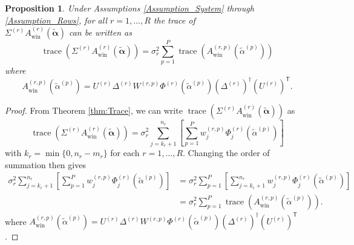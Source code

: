\documentclass[12pt]{article}
\newcommand{\trans}[1]{{#1}^\mathsf{T}}	%
\newcommand{\pinv}[1]{{#1}^\dagger}	%
\DeclareMathOperator{\trace}{trace}		%
\newcommand{\regparam}{\alpha}  %
\newcommand{\regparamVec}{\bm{\regparam}}   %
\newcommand{\regparamBig}{\widetilde{\regparam}}   %
\newcommand{\regparamVecBig}{\widetilde{\regparamVec}}   %
\newcommand{\AWin}{A_{\text{win}}}	%
\newcommand{\noiseSD}{\sigma}	%
\newtheorem{proposition}{Proposition}[section]
\begin{document}
\begin{proposition}
\label{prop:Window Trace}
Under Assumptions \ref{Assumption_System} through \ref{Assumption_Rows}, for all $r = 1,\ldots,R$ the trace of \\ $\Sigma^{(r)}\AWin^{(r)}\left(\regparamVecBig\right)$ can be written as
\[\trace\left(\Sigma^{(r)}\AWin^{(r)}\left(\regparamVecBig\right)\right) = \noiseSD_r^2 \sum_{p=1}^P \trace\left(\AWin^{(r,p)}\left(\regparamBig^{(p)}\right)\right)\]
where
\[\AWin^{(r,p)}\left(\regparamBig^{(p)}\right) = U^{(r)}\Delta^{(r)}W^{(r,p)}\Phi^{(r)}\left(\regparamBig^{(p)}\right)\pinv{\left(\Delta^{(r)}\right)}\trans{\left(U^{(r)}\right)}.\]
\end{proposition}
\begin{proof}
From Theorem \ref{thm:Trace}, we can write $\trace\left(\Sigma^{(r)}\AWin^{(r)}\left(\regparamVecBig\right)\right)$ as
\[\trace\left(\Sigma^{(r)}\AWin^{(r)}\left(\regparamVecBig\right)\right) = \noiseSD_r^2 \sum_{j = k_r + 1}^{n_r} \left[\sum_{p=1}^{P} w_j^{(r,p)} \Phi_j^{(r)}\left(\regparamBig^{(p)}\right)\right]\]
with $k_r = \min\{0,n_r - m_r\}$ for each $r = 1,\ldots,R$. Changing the order of summation then gives
\begin{align*}
\noiseSD_r^2 \sum_{j = k_r + 1}^{n_r} \left[\sum_{p=1}^{P} w_j^{(r,p)} \Phi_j^{(r)}\left(\regparamBig^{(p)}\right)\right] &= \noiseSD_r^2 \sum_{p=1}^{P} \left[\sum_{j = k_r + 1}^{n_r} w_j^{(r,p)} \Phi_j^{(r)}\left(\regparamBig^{(p)}\right)\right] \\
&= \noiseSD_r^2 \sum_{p=1}^{P} \trace\left(\AWin^{(r,p)}\left(\regparamBig^{(p)}\right)\right).
\end{align*}
where $\AWin^{(r,p)}\left(\regparamBig^{(p)}\right) = U^{(r)}\Delta^{(r)}W^{(r,p)}\Phi^{(r)}\left(\regparamBig^{(p)}\right)\pinv{\left(\Delta^{(r)}\right)}\trans{\left(U^{(r)}\right)}$.
\end{proof}
\end{document}
